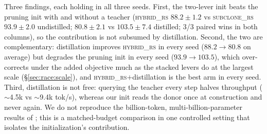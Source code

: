 Three findings, each holding in all three seeds. First, the two-lever init beats
the pruning init with and without a teacher (\textsc{hybrid\_rs} $88.2\pm1.2$ vs
\textsc{subclone\_rs} $93.9\pm2.0$ undistilled; $80.8\pm2.1$ vs $103.5\pm7.4$
distilled; 3/3 paired wins in both columns), so the contribution is not subsumed
by distillation. Second, the two are complementary: distillation improves
\textsc{hybrid\_rs} in every seed ($88.2\to80.8$ on average) but degrades the
pruning init in every seed ($93.9\to103.5$), which over-corrects under the added
objective much as the stacked levers do at the largest scale
(\S\ref{sec:race:scale}), and \textsc{hybrid\_rs}$+$distillation is the best arm
in every seed.
Third, distillation is not free: querying the teacher every step halves throughput
($\sim$4.5k vs $\sim$9.4k tok/s), whereas our init reads the donor once at
construction and never again. We do not reproduce the billion-token,
multi-billion-parameter results of \citet{muralidharan2024minitron,xia2024sheared};
this is a matched-budget comparison in one controlled setting that isolates the
initialization's contribution.
